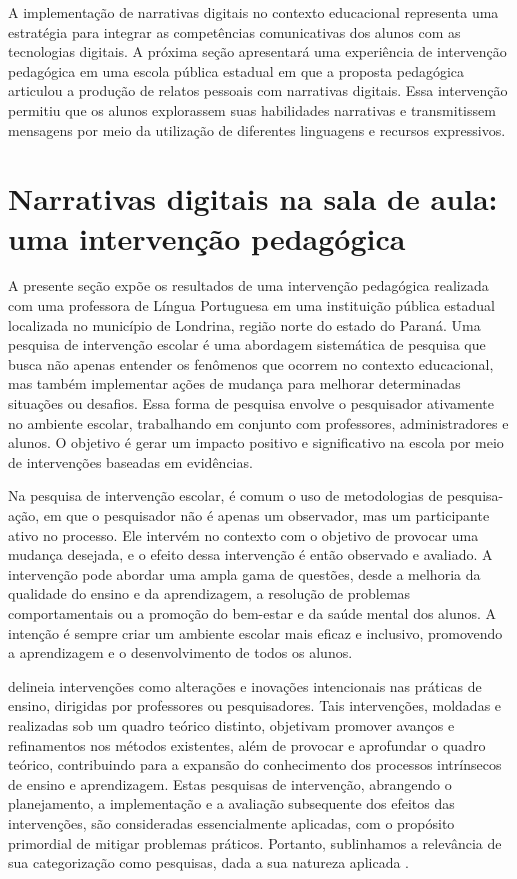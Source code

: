 \documentclass[portuguese]{textolivre}
\begin{document}
A implementação de narrativas digitais no contexto educacional representa uma estratégia para integrar as competências comunicativas dos alunos com as tecnologias digitais. A próxima seção apresentará uma experiência de intervenção pedagógica em uma escola pública estadual em que a proposta pedagógica articulou a produção de relatos pessoais com narrativas digitais. Essa intervenção permitiu que os alunos explorassem suas habilidades narrativas e transmitissem mensagens por meio da utilização de diferentes linguagens e recursos expressivos.



\section{Narrativas digitais na sala de aula: uma intervenção pedagógica}

A presente seção expõe os resultados de uma intervenção pedagógica realizada com uma professora de Língua Portuguesa em uma instituição pública estadual localizada no município de Londrina, região norte do estado do Paraná. Uma pesquisa de intervenção escolar é uma abordagem sistemática de pesquisa que busca não apenas entender os fenômenos que ocorrem no contexto educacional, mas também implementar ações de mudança para melhorar determinadas situações ou desafios. Essa forma de pesquisa envolve o pesquisador ativamente no ambiente escolar, trabalhando em conjunto com professores, administradores e alunos. O objetivo é gerar um impacto positivo e significativo na escola por meio de intervenções baseadas em evidências.

Na pesquisa de intervenção escolar, é comum o uso de metodologias de pesquisa-ação, em que o pesquisador não é apenas um observador, mas um participante ativo no processo. Ele intervém no contexto com o objetivo de provocar uma mudança desejada, e o efeito dessa intervenção é então observado e avaliado. A intervenção pode abordar uma ampla gama de questões, desde a melhoria da qualidade do ensino e da aprendizagem, a resolução de problemas comportamentais ou a promoção do bem-estar e da saúde mental dos alunos. A intenção é sempre criar um ambiente escolar mais eficaz e inclusivo, promovendo a aprendizagem e o desenvolvimento de todos os alunos.

\textcite{damiani2012} delineia intervenções como alterações e inovações intencionais nas práticas de ensino, dirigidas por professores ou pesquisadores. Tais intervenções, moldadas e realizadas sob um quadro teórico distinto, objetivam promover avanços e refinamentos nos métodos existentes, além de provocar e aprofundar o quadro teórico, contribuindo para a expansão do conhecimento dos processos intrínsecos de ensino e aprendizagem. Estas pesquisas de intervenção, abrangendo o planejamento, a implementação e a avaliação subsequente dos efeitos das intervenções, são consideradas essencialmente aplicadas, com o propósito primordial de mitigar problemas práticos. Portanto, sublinhamos a relevância de sua categorização como pesquisas, dada a sua natureza aplicada \cite{damiani2013discutindo}. 
\end{document}

